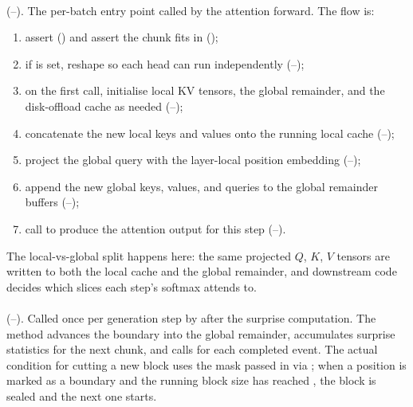 \paragraph{} (--). The per-batch entry point called by the attention forward. The flow is:
\begin{enumerate}
  \item assert  () and assert the chunk fits in  ();
  \item if  is set, reshape so each head can run independently (--);
  \item on the first call, initialise local KV tensors, the global remainder, and the disk-offload cache as needed (--);
  \item concatenate the new local keys and values onto the running local cache (--);
  \item project the global query with the layer-local position embedding (--);
  \item append the new global keys, values, and queries to the global remainder buffers (--);
  \item call  to produce the attention output for this step (--).
\end{enumerate}
The local-vs-global split happens here: the same projected $Q$, $K$, $V$ tensors are written to both the local cache and the global remainder, and downstream code decides which slices each step's softmax attends to.

\paragraph{} (--). Called once per generation step by  after the surprise computation. The method advances the boundary into the global remainder, accumulates surprise statistics for the next chunk, and calls  for each completed event. The actual condition for cutting a new block uses the  mask passed in via ; when a position is marked as a boundary and the running block size has reached , the block is sealed and the next one starts.

